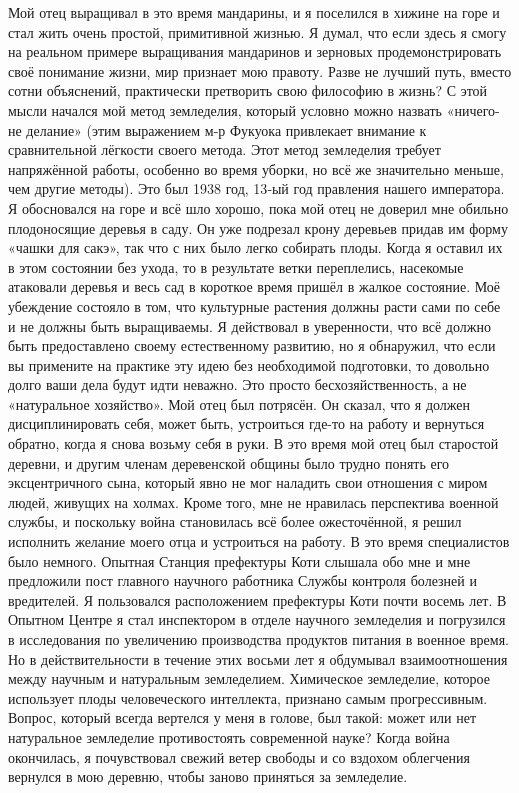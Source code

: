 \documentclass[a4paper]{book}
\begin{document}
Мой отец выращивал в это время мандарины, и я поселился в хижине на горе и стал
жить очень простой, примитивной жизнью. Я думал, что если здесь я смогу на реальном
примере выращивания мандаринов и зерновых продемонстрировать своё понимание жизни,
мир признает мою правоту. Разве не лучший путь, вместо сотни объяснений, практически
претворить свою философию в жизнь? С этой мысли начался мой метод земледелия,
который условно можно назвать «ничего-не делание» (этим выражением м-р Фукуока
привлекает внимание к сравнительной лёгкости своего метода. Этот метод земледелия
требует напряжённой работы, особенно во время уборки, но всё же значительно меньше, чем
другие методы). Это был 1938 год, 13‑ый год правления нашего императора.
Я обосновался на горе и всё шло хорошо, пока мой отец не доверил мне обильно
плодоносящие деревья в саду. Он уже подрезал крону деревьев придав им форму «чашки для
сакэ», так что с них было легко собирать плоды. Когда я оставил их в этом состоянии без
ухода, то в результате ветки переплелись, насекомые атаковали деревья и весь сад в короткое
время пришёл в жалкое состояние.
Моё убеждение состояло в том, что культурные растения должны расти сами по себе и
не должны быть выращиваемы. Я действовал в уверенности, что всё должно быть
предоставлено своему естественному развитию, но я обнаружил, что если вы примените на
практике эту идею без необходимой подготовки, то довольно долго ваши дела будут идти
неважно. Это просто бесхозяйственность, а не «натуральное хозяйство». Мой отец был
потрясён. Он сказал, что я должен дисциплинировать себя, может быть, устроиться где-то на
работу и вернуться обратно, когда я снова возьму себя в руки. В это время мой отец был
старостой деревни, и другим членам деревенской общины было трудно понять его
эксцентричного сына, который явно не мог наладить свои отношения с миром людей,
живущих на холмах. Кроме того, мне не нравилась перспектива военной службы, и поскольку
война становилась всё более ожесточённой, я решил исполнить желание моего отца и
устроиться на работу.
В это время специалистов было немного. Опытная Станция префектуры Коти слышала
обо мне и мне предложили пост главного научного работника Службы контроля болезней и
вредителей. Я пользовался расположением префектуры Коти почти восемь лет. В Опытном
Центре я стал инспектором в отделе научного земледелия и погрузился в исследования по
увеличению производства продуктов питания в военное время. Но в действительности в
течение этих восьми лет я обдумывал взаимоотношения между научным и натуральным
земледелием. Химическое земледелие, которое использует плоды человеческого интеллекта,
признано самым прогрессивным. Вопрос, который всегда вертелся у меня в голове, был
такой: может или нет натуральное земледелие противостоять современной науке?
Когда война окончилась, я почувствовал свежий ветер свободы и со вздохом облегчения
вернулся в мою деревню, чтобы заново приняться за земледелие.
\end{document}
